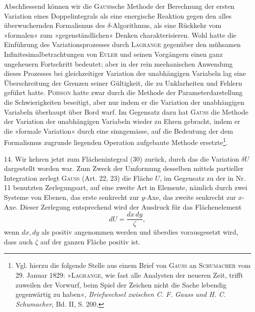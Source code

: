 Abschliessend können wir die \textsc{Gauss}sche Methode der Berechnung der
ersten Variation eines Doppelintegrals als eine energische Reaktion gegen den
alles überwuchernden Formalismus des $\delta$-Algorithmus, als eine Rückkehr vom
»formalen« zum »gegenständlichen« Denken charakterisieren. Wohl hatte die
Einführung des Variationsprozesses durch \textsc{Lagrange} gegenüber den mühsamen
Infinitesimalbetrachtungen von \textsc{Euler} und seinen Vorgängern einen ganz ungeheuern
Fortschritt bedeutet; aber in der rein mechanischen Anwendung dieses
Prozesses bei gleichzeitiger Variation der unabhängigen Variabeln lag eine
Überschreitung der Grenzen seiner Gültigkeit, die zu Unklarheiten und Fehlern
geführt hatte. \textsc{Poisson} hatte zwar durch die Methode der Parameterdarstellung
die Schwierigkeiten beseitigt, aber nur indem er die Variation der unabhängigen
Variabeln überhaupt über Bord warf. Im Gegensatz dazu hat \textsc{Gauss}
die Methode der Variation der unabhängigen Variabeln wieder zu Ehren gebracht,
indem er die »formale Variation« durch eine sinngemässe, auf die Bedeutung
der dem Formalismus zugrunde liegenden Operation aufgebaute Methode
ersetzte\begingroup\renewcommand{\thefootnote}{39a)}\footnote{Vgl. hierzu die folgende Stelle aus einem Brief von \textsc{Gauss} an \textsc{Schumacher} vom 29. Januar 1829: »\textsc{Lagrange}, wie fast alle Analysten der neueren Zeit, trifft zuweilen der Vorwurf, beim Spiel der Zeichen nicht  die Sache lebendig gegenwärtig zu haben«, \textit{Briefwechsel zwischen C. F. Gauss und H. C. Schumacher}, Bd. II, S. 200.}\endgroup\setcounter{footnote}{39}.
\par\clearpage{}
\begin{center}\end{center}
\noindent\hspace*{\parindent}14. Wir kehren jetzt zum Flächenintegral (30) zurück, durch das die
Variation $\delta U$ dargestellt worden war. Zum Zweck der Umformung desselben
mittels partieller Integration zerlegt \textsc{Gauss} (Art. 22, 23) die Fläche $U$, im
Gegensatz zu der in Nr. 11 benutzten Zerlegungsart, auf eine zweite Art in
Elemente, nämlich durch zwei Systeme von Ebenen, das erste senkrecht zur
$y$-Axe, das zweite senkrecht zur $x$-Axe. Dieser Zerlegung entsprechend wird
der Ausdruck für das Flächenelement
\begin{equation*}
dU=\frac{dx\,dy}{\zeta},\tag{36}
\end{equation*}
wenn $dx,dy$ als positiv angenommen werden und überdies vorausgesetzt wird,
dass auch $\zeta$ auf der ganzen Fläche positiv ist.

